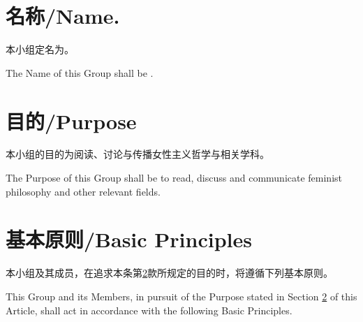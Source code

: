 \documentclass[12pt]{aspasia-constitution}
\begin{document}
	
	\frontmatter
	
	
	
	\tableofcontents
	
	\mainmatter
	
	 \label{art:name}
	
	\section{名称/Name.}
	
	本小组定名为\name。
	
	The Name of this Group shall be \name.
	
	\section{目的/Purpose}\label{sec:purpose} 
	
	本小组的目的为阅读、讨论与传播女性主义哲学与相关学科。
	
	The Purpose of this Group shall be to read, discuss and communicate feminist philosophy and other relevant fields.
	
	\section{基本原则/Basic Principles}\label{sec:principle}
	
	本小组及其成员，在追求本条第\ref{sec:purpose}款所规定的目的时，将遵循下列基本原则。
	
	This Group and its Members, in pursuit of the Purpose stated in Section \ref{sec:purpose} of this Article, shall act in accordance with the following Basic Principles.
	
	\newpage
	
\end{document}
